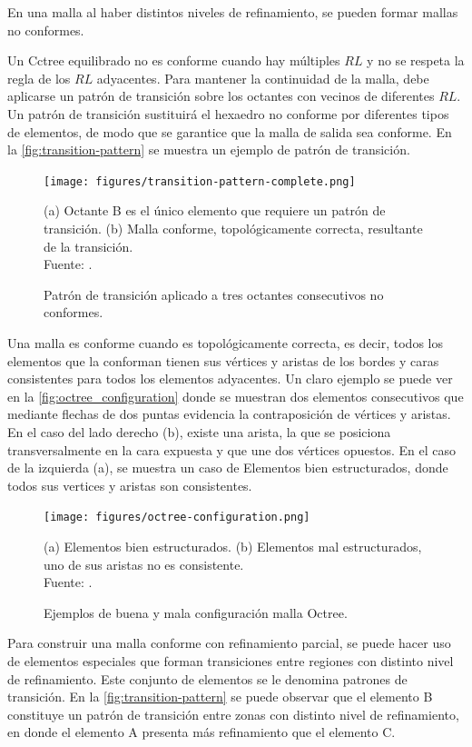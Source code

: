 En una malla al haber distintos niveles de refinamiento, se pueden formar mallas no conformes. 

Un Cctree equilibrado no es conforme cuando hay múltiples $RL$ y no se respeta la regla de los $RL$ adyacentes. Para mantener la continuidad de la malla, debe aplicarse un patrón de transición sobre los octantes con vecinos de diferentes $RL$. Un patrón de transición sustituirá el hexaedro no conforme por diferentes tipos de elementos, de modo que se garantice que la malla de salida sea conforme. En la \autoref{fig:transition-pattern} se muestra un ejemplo de patrón de transición.


\begin{figure}[!ht]
	\centering
	\texttt{[image: figures/transition-pattern-complete.png]}
	\caption{\label{fig:transition-pattern} Patrón de transición aplicado a tres octantes consecutivos no conformes.} 
	\small{(a) Octante B es el único elemento que requiere un patrón de transición. (b) Malla conforme, topológicamente correcta, resultante de la transición.} \\ Fuente: \cite{lobos2015mixed}.
\end{figure}

Una malla es conforme cuando es topológicamente correcta, es decir, todos los elementos que la conforman tienen sus vértices y aristas de los bordes y caras consistentes para todos los elementos adyacentes. Un claro ejemplo se puede ver en la \autoref{fig:octree_configuration} donde se muestran dos elementos consecutivos que mediante flechas de dos puntas evidencia la contraposición de vértices y aristas. En el caso del lado derecho (b), existe una arista, la que se posiciona transversalmente en la cara expuesta y que une dos vértices opuestos. En el caso de la izquierda (a), se muestra un caso de Elementos bien estructurados, donde todos sus vertices y aristas son consistentes.

\begin{figure}[!ht]
	\centering
	\texttt{[image: figures/octree-configuration.png]}
	\caption{\label{fig:octree_configuration} Ejemplos de buena y mala configuración malla Octree.} 
	\small{(a) Elementos bien estructurados. (b) Elementos mal estructurados, uno de sus aristas no es consistente.} \\ Fuente: \cite{lobos2015mixed}.
\end{figure}

Para construir una malla conforme con refinamiento parcial, se puede hacer uso de elementos especiales que forman transiciones entre regiones con distinto nivel de refinamiento. Este conjunto de elementos se le denomina patrones de transición. En la \autoref{fig:transition-pattern} se puede observar que el elemento B constituye un patrón de transición entre zonas con distinto nivel de refinamiento, en donde el elemento A presenta más refinamiento que el elemento C.

